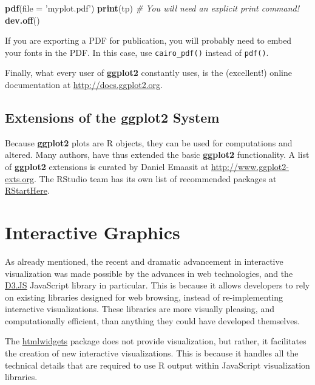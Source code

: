 \documentclass[]{book}
\newenvironment{Shaded}{\begin{snugshade}}{\end{snugshade}}
\newcommand{\KeywordTok}[1]{\textcolor[rgb]{0.13,0.29,0.53}{\textbf{#1}}}
\newcommand{\DataTypeTok}[1]{\textcolor[rgb]{0.13,0.29,0.53}{#1}}
\newcommand{\StringTok}[1]{\textcolor[rgb]{0.31,0.60,0.02}{#1}}
\newcommand{\CommentTok}[1]{\textcolor[rgb]{0.56,0.35,0.01}{\textit{#1}}}
\newcommand{\NormalTok}[1]{#1}
\theoremstyle{definition}
\theoremstyle{definition}
\theoremstyle{definition}
\theoremstyle{remark}
\let\BeginKnitrBlock\begin \let\EndKnitrBlock\end
\begin{document}
\begin{Shaded}
\begin{Highlighting}[]
\KeywordTok{pdf}\NormalTok{(}\DataTypeTok{file =} \StringTok{'myplot.pdf'}\NormalTok{)}
\KeywordTok{print}\NormalTok{(tp) }\CommentTok{# You will need an explicit print command!}
\KeywordTok{dev.off}\NormalTok{()}
\end{Highlighting}
\end{Shaded}

\BeginKnitrBlock{remark}
{}If you are exporting a PDF for publication,
you will probably need to embed your fonts in the PDF. In this case, use
\texttt{cairo\_pdf()} instead of \texttt{pdf()}.
\EndKnitrBlock{remark}

Finally, what every user of \textbf{ggplot2} constantly uses, is the
(excellent!) online documentation at \url{http://docs.ggplot2.org}.

\subsection{Extensions of the ggplot2
System}\label{extensions-of-the-ggplot2-system}

Because \textbf{ggplot2} plots are R objects, they can be used for
computations and altered. Many authors, have thus extended the basic
\textbf{ggplot2} functionality. A list of \textbf{ggplot2} extensions is
curated by Daniel Emaasit at
\href{http://www.ggplot2-exts.org/gallery/}{http://www.ggplot2-exts.org}.
The RStudio team has its own list of recommended packages at
\href{https://github.com/rstudio/RStartHere}{RStartHere}.

\section{Interactive Graphics}\label{interactive-graphics}

As already mentioned, the recent and dramatic advancement in interactive
visualization was made possible by the advances in web technologies, and
the \href{https://d3js.org/}{D3.JS} JavaScript library in particular.
This is because it allows developers to rely on existing libraries
designed for web browsing, instead of re-implementing interactive
visualizations. These libraries are more visually pleasing, and
computationally efficient, than anything they could have developed
themselves.

The \href{http://www.htmlwidgets.org/}{htmlwidgets} package does not
provide visualization, but rather, it facilitates the creation of new
interactive visualizations. This is because it handles all the technical
details that are required to use R output within JavaScript
visualization libraries.
\end{document}
